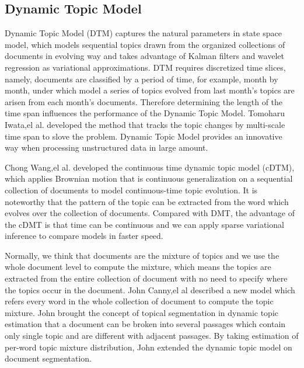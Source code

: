 \subsection{Dynamic Topic Model}

Dynamic Topic Model (DTM)\cite{blei2006dynamic} captures the natural parameters in state space model, which models sequential topics drawn from the organized collections of documents in evolving way and takes advantage of Kalman filters and wavelet regression as variational approximations. DTM requires discretized time slices, namely, documents are classified by a period of time, for example, month by month, under which model a series of topics evolved from last month’s topics are arisen from each month’s documents. Therefore determining the length of the time span influences the performance of the Dynamic Topic Model. Tomoharu Iwata,el al. \cite{iwata2009topic} developed the method that tracks the topic changes by multi-scale time span to slove the problem. Dynamic Topic Model provides an innovative way when processing unstructured data in large amount.

Chong Wang,el al.\cite{wang2012continuous} developed the continuous time dynamic topic model (cDTM), which applies Brownian motion that is continuous generalization on a sequential collection of documents to model continuous-time topic evolution. It is noteworthy that the pattern of the topic can be extracted from the word which evolves over the collection of documents. Compared with DMT, the advantage of the cDMT is that time can be continuous and we can apply sparse variational inference to compare models in faster speed. 

Normally, we think that documents are the mixture of topics and we use the whole document level to compute the mixture, which means the topics are extracted from the entire collection of document with no need to specify where the topics occur in the document. John Canny,el al \cite{canny2006dynamic} described a new model which refers every word in the whole collection of document to compute the topic mixture. John brought the concept of topical segmentation in dynamic topic estimation that a document can be broken into several passages which contain only single topic and are different with adjacent passages. By taking estimation of per-word topic mixture distribution, John extended the dynamic topic model on document segmentation.

